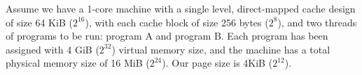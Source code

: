 \begin{blocksection}
\question 
Assume we have a 1-core machine with a single level, direct-mapped cache design of size 64 KiB ($2^{16}$), with each cache block of size 256 bytes ($2^8$), and two threads of programs to be run: program A and program B. Each program has been assigned with 4 GiB ($2^{32}$) virtual memory size, and the machine has a total physical memory size of 16 MiB ($2^{24}$). Our page size is 4KiB ($2^{12}$).


\end{blocksection}